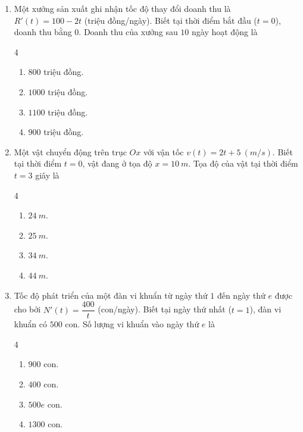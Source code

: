 \documentclass[12pt]{article}
\begin{document}
\begin{enumerate}[label=\textbf{Câu \arabic*.}]
		\item Một xưởng sản xuất ghi nhận tốc độ thay đổi doanh thu là $R'(t) = 100 - 2t$ (triệu đồng/ngày). Biết tại thời điểm bắt đầu ($t=0$), doanh thu bằng $0$. Doanh thu của xưởng sau $10$ ngày hoạt động là
		\begin{multicols}{4}
			\begin{enumerate}[label=\textbf{\Alph*.}]
				\item $800$ triệu đồng.
				\item $1000$ triệu đồng.
				\item $1100$ triệu đồng.
				\item $900$ triệu đồng.
			\end{enumerate}
		\end{multicols}
		
		\item Một vật chuyển động trên trục $Ox$ với vận tốc $v(t) = 2t + 5 \ (m/s)$. Biết tại thời điểm $t = 0$, vật đang ở tọa độ $x = 10 \ m$. Tọa độ của vật tại thời điểm $t = 3$ giây là
		\begin{multicols}{4}
			\begin{enumerate}[label=\textbf{\Alph*.}]
				\item $24 \ m$.
				\item $25 \ m$.
				\item $34 \ m$.
				\item $44 \ m$.
			\end{enumerate}
		\end{multicols}
		
		\item Tốc độ phát triển của một đàn vi khuẩn từ ngày thứ $1$ đến ngày thứ $e$ được cho bởi $N'(t) = \dfrac{400}{t}$ (con/ngày). Biết tại ngày thứ nhất ($t = 1$), đàn vi khuẩn có $500$ con. Số lượng vi khuẩn vào ngày thứ $e$ là
		\begin{multicols}{4}
			\begin{enumerate}[label=\textbf{\Alph*.}]
				\item $900$ con.
				\item $400$ con.
				\item $500e$ con.
				\item $1300$ con.
			\end{enumerate}
		\end{multicols}
		

\end{enumerate}
\end{document}

